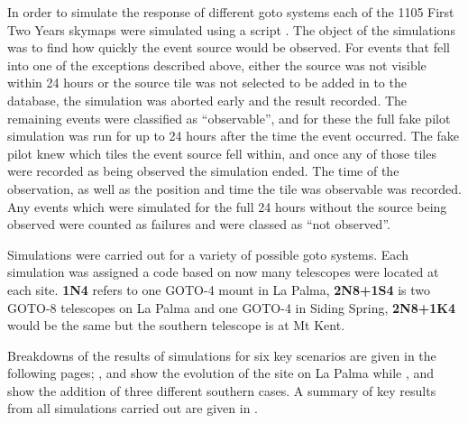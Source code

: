 \begin{colsection}
\begin{colsection}
In order to simulate the response of different \gls{goto} systems each of the 1105 First Two Years skymaps were simulated using a script . The object of the simulations was to find how quickly the event source would be observed. For events that fell into one of the exceptions described above, either the source was not visible within 24 hours or the source tile was not selected to be added in to the database, the simulation was aborted early and the result recorded. The remaining events were classified as ``observable'', and for these the full fake pilot simulation was run for up to 24 hours after the time the event occurred. The fake pilot knew which tiles the event source fell within, and once any of those tiles were recorded as being observed the simulation ended. The time of the observation, as well as the position and time the tile was observable was recorded. Any events which were simulated for the full 24 hours without the source being observed were counted as failures and were classed as ``not observed''.

Simulations were carried out for a variety of possible \gls{goto} systems. Each simulation was assigned a code based on now many telescopes were located at each site. \textbf{1N4} refers to one GOTO-4 mount in La Palma, \textbf{2N8+1S4} is two GOTO-8 telescopes on La Palma and one GOTO-4 in Siding Spring, \textbf{2N8+1K4} would be the same but the southern telescope is at Mt Kent.

Breakdowns of the results of simulations for six key scenarios are given in the following pages; ,  and  show the evolution of the site on La Palma while ,  and  show the addition of three different southern cases. A summary of key results from all simulations carried out are given in .

\newpage


\begin{figure}[p]
\begin{center}


\end{center}
\end{figure}
\end{colsection}
\end{colsection}
